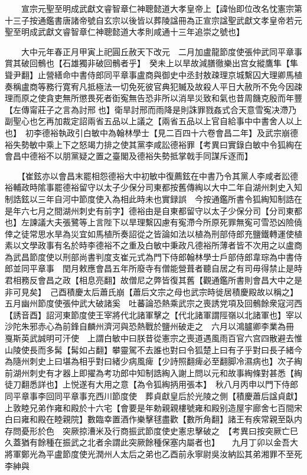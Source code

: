 　　宣宗元聖至明成武獻文睿智章仁神聰懿道大孝皇帝上【諱怡即位改名忱憲宗第十三子按通鑑書唐諸帝號自玄宗以後皆以葬陵諡冊為正宣宗諡聖武獻文孝皇帝若元聖至明成武獻文睿智章仁神聰懿道大孝則咸通十三年追崇之號也】

　　大中元年春正月甲寅上祀圓丘赦天下改元　二月加盧龍節度使張仲武同平章事賞其破回鶻也【石雄獨非破回鶻者乎】　癸未上以旱故減膳徹樂出宫女縱鷹隼【隼聳尹翻】止營繕命中書侍郎同平章事盧商與御史中丞封敖疎理京城繫囚大理卿馬植奏稱盧商等務行寛宥凡抵極法一切免死彼官典犯贓及故殺人平日大赦所不免今因疎理而原之使貪吏無所懲畏死者衘寃無告恐非所以消旱災致和氣也昔周饑克殷而年豐【左傳甯莊子之言為討邢也】衛旱討邢而雨降是則誅罪戮姦式合天意雪寃决滯乃副聖心也乞再加裁定詔兩省五品以上議之【兩省五品以上官自給事中中書舍人以上也】　初李德裕執政引白敏中為翰林學士【見二百四十六卷會昌二年】及武宗崩德裕失勢敏中乘上下之怒竭力排之使其黨李咸訟德裕罪【考異曰實錄白敏中令狐綯在會昌中德裕不以朋黨疑之置之臺閣及德裕失勢抵掌戟手同謀斥逐而】

　　【崔鉉亦以會昌末罷相怨德裕大中初敏中復薦鉉在中書乃令其黨人李咸者訟德裕輔政時隂事罷德裕留守以太子少保分司東都按舊傳綯以大中二年自湖州刺史入知制誥鉉以三年自河中節度使入為相此時未也實録誤　今按通鑑所書令狐綯知制誥在是年六七月之間湖州刺史有前字】德裕由是自東都留守以太子少保分司【分司東都也】左諫議大夫張鷺等上言陛下以旱理繫囚慮有寃滯今所原死罪無寃可雪恐凶險僥倖之徒常思水旱為災宜如馬植所奏詔從之皆論如法以植為刑部侍郎充鹽鐵轉運使植素以文學政事有名於時李德裕不之重及白敏中秉政凡德裕所薄者皆不次用之以盧商為武昌節度使以刑部尚書判度支崔元式為門下侍郎翰林學士戶部侍郎韋琮為中書侍郎並同平章事　閏月敕應會昌五年所廢寺有僧能營葺者聽自居之有司毋得禁止是時君相務反會昌之政【相息亮翻】故僧尼之弊皆復其舊【觀通鑑所書則會昌大中之是非可見矣】　己酉積慶太后蕭氏崩【蕭后文宗之母也武宗時徙居積慶殿故以稱之】　五月幽州節度使張仲武大破諸奚　吐蕃論恐熱乘武宗之喪誘党項及回鶻餘衆寇河西【誘音酉】詔河東節度使王宰將代北諸軍擊之【代北諸軍謂陘嶺以北諸軍也】宰以沙陀朱邪赤心為前鋒自麟州濟河與恐熱戰於鹽州破走之　六月以鴻臚卿李業為冊戛斯英武誠明可汗使　上謂白敏中曰朕昔從憲宗之喪道遇風雨百官六宫四散避去惟山陵使長而多髯【髯如占翻】攀靈駕不去誰也對曰令狐楚上曰有子乎對曰長子緒今為隨州刺史上曰堪為相乎對曰緒少病風痺【少詩照翻痺必至翻脚冷濕病也】次子綯前湖州刺史有才器上即擢為考功郎中知制誥綯入謝上問以元和故事綯條對甚悉【綯徒刀翻悉詳也】上悦遂有大用之意【為令狐綯抦用張本】　秋八月丙申以門下侍郎同平章事李回同平章事充西川節度使　葬貞獻皇后於光陵之側【積慶蕭后諡貞獻】　上敦睦兄弟作雍和殿於十六宅【會要是年勅親親樓號雍和殿别造屋宇廊舍七百間宋白曰雍和殿在睦親院】數臨幸置酒作樂擊毬盡歡【數所角翻】諸王有疾常親至臥内存問憂形於色　突厥掠漕米及行商振武節度使史憲忠擊破之　【考異曰按突厥亡巳久蓋猶有餘種在振武之北者余謂此突厥餘種保塞内屬者也】　　九月丁卯以金吾大將軍鄭光為平盧節度使光潤州人太后之弟也乙酉前永寧尉吳汝納訟其弟湘罪不至死李紳與

